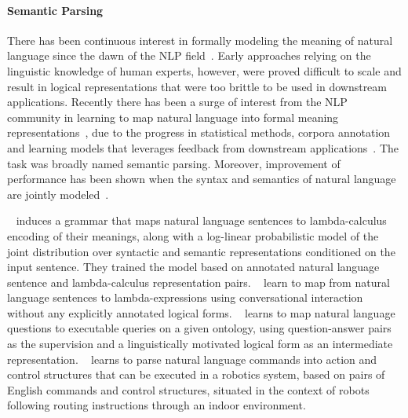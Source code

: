 \paragraph{Semantic Parsing} 
There has been continuous interest in formally modeling the meaning of natural language since the dawn of the NLP field~\cite{opac-b1080356}. Early approaches relying on the linguistic knowledge of human experts, however, were proved difficult to scale and result in logical representations that were too brittle to be used in downstream applications. 
Recently there has been a surge of interest from the NLP community in learning to map natural language into formal meaning representations~\cite{Zettlemoyer05learningto,Kwiatkowski:2011:LGC:2145432.2145593,DBLP:Poon13}, due to the progress in statistical methods, corpora annotation and learning models that leverages feedback from downstream applications~\cite{artzi2013weakly}. The task was broadly named semantic parsing. Moreover, improvement of performance has been shown when the syntax and semantics of natural language are jointly modeled~\cite{Zettlemoyer05learningto,lewis2015joint}.

~\cite{Zettlemoyer05learningto} induces a grammar that maps natural language sentences to lambda-calculus encoding of their meanings, along with a log-linear probabilistic model of the joint distribution over syntactic and semantic representations conditioned on the input sentence. They trained the model based on annotated natural language sentence and lambda-calculus representation pairs.
~\cite{Artzi:2011:BSP:2145432.2145481} learn to map from natural language sentences to lambda-expressions using conversational interaction without any explicitly annotated logical forms.
~\cite{kwiatkowski-EtAl:2013:EMNLP} learns to map natural language questions to executable queries on a given ontology, using question-answer pairs as the supervision and a linguistically motivated logical form as an intermediate representation.
~\cite{conf/iser/MatuszekHZF12} learns to parse natural language commands into action and control structures that can be executed in a robotics system, based on pairs of English commands and control structures, situated in the context of robots following routing instructions through an indoor environment.

